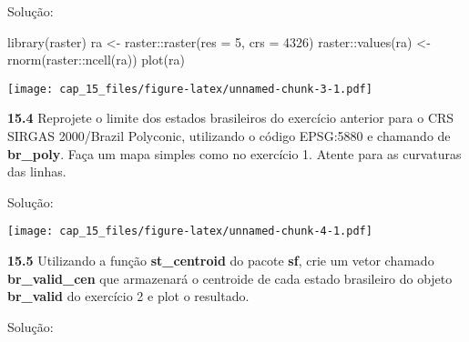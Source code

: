\documentclass[
]{book}
\newenvironment{Shaded}{\begin{snugshade}}{\end{snugshade}}
\newcommand{\AttributeTok}[1]{\textcolor[rgb]{0.77,0.63,0.00}{#1}}
\newcommand{\ConstantTok}[1]{\textcolor[rgb]{0.00,0.00,0.00}{#1}}
\newcommand{\DecValTok}[1]{\textcolor[rgb]{0.00,0.00,0.81}{#1}}
\newcommand{\FunctionTok}[1]{\textcolor[rgb]{0.00,0.00,0.00}{#1}}
\newcommand{\NormalTok}[1]{#1}
\newcommand{\OtherTok}[1]{\textcolor[rgb]{0.56,0.35,0.01}{#1}}
\newcommand{\SpecialCharTok}[1]{\textcolor[rgb]{0.00,0.00,0.00}{#1}}
\newcommand{\StringTok}[1]{\textcolor[rgb]{0.31,0.60,0.02}{#1}}
\begin{document}
Solução:

\begin{Shaded}
\begin{Highlighting}[]
\FunctionTok{library}\NormalTok{(raster)}
\NormalTok{ra }\OtherTok{\textless{}{-}}\NormalTok{ raster}\SpecialCharTok{::}\FunctionTok{raster}\NormalTok{(}\AttributeTok{res =} \DecValTok{5}\NormalTok{, }\AttributeTok{crs =} \DecValTok{4326}\NormalTok{)}
\NormalTok{raster}\SpecialCharTok{::}\FunctionTok{values}\NormalTok{(ra) }\OtherTok{\textless{}{-}} \FunctionTok{rnorm}\NormalTok{(raster}\SpecialCharTok{::}\FunctionTok{ncell}\NormalTok{(ra))}
\FunctionTok{plot}\NormalTok{(ra)}
\end{Highlighting}
\end{Shaded}

\texttt{[image: cap\_15\_files/figure-latex/unnamed-chunk-3-1.pdf]}

\textbf{15.4}
Reprojete o limite dos estados brasileiros do exercício anterior para o CRS SIRGAS 2000/Brazil Polyconic, utilizando o código EPSG:5880 e chamando de \textbf{br\_poly}. Faça um mapa simples como no exercício 1. Atente para as curvaturas das linhas.

Solução:

\begin{Shaded}
\end{Shaded}

\texttt{[image: cap\_15\_files/figure-latex/unnamed-chunk-4-1.pdf]}

\textbf{15.5}
Utilizando a função \textbf{st\_centroid} do pacote \textbf{sf}, crie um vetor chamado \textbf{br\_valid\_cen} que armazenará o centroide de cada estado brasileiro do objeto \textbf{br\_valid} do exercício 2 e plot o resultado.

Solução:
\end{document}
